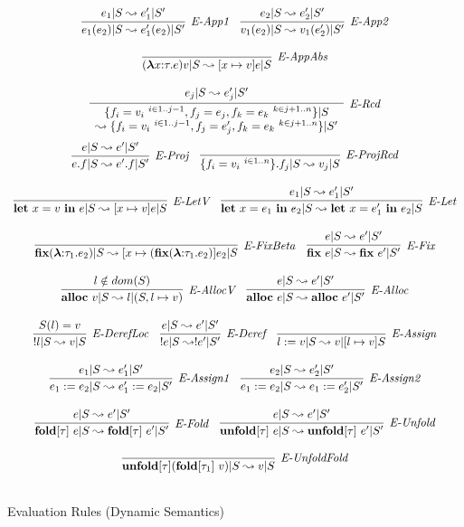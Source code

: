 \begin{figure}
\centering
\[
\begin{array}{c}
\infer[\textit{E-App1}]
	{e_1(e_2) | S \leadsto e_1'(e_2) | S'}
	{e_1 | S \leadsto e_1' | S'}
~~~
\infer[\textit{E-App2}]
	{v_1(e_2) | S \leadsto v_1(e_2') | S'}
	{e_2 | S \leadsto e_2' | S'}
\\[3ex]
\infer[\textit{E-AppAbs}]
	{(\boldsymbol\lambda x{:}\tau . e) v | S \leadsto [x \mapsto v] e | S}
	{}
\\[3ex]
\infer[\textit{E-Rcd}]
	{
\begin{array}{c}
\{ f_i = v_i ~ ^{i \in 1..j-1}, f_j = e_j, f_k = e_k ~ ^{k \in j+1..n} \} | S \\
\leadsto \{ f_i = v_i ~ ^{i \in 1..j-1}, f_j = e_j', f_k = e_k ~ ^{k \in j+1..n}\} | S'
\end{array}
	}
	{e_j | S \leadsto e_j' | S'}
\\[3ex]
\infer[\textit{E-Proj}]
	{e.f | S \leadsto e'.f | S'}
	{e | S \leadsto e' | S'}
~~~
\infer[\textit{E-ProjRcd}]
	{\{f_i = v_i ~ ^{i \in 1..n}\}.f_j | S \leadsto v_j | S}
	{}
\\[3ex]
\infer[\textit{E-LetV}]
	{\keyw{let}~ x=v ~\keyw{in}~ e | S \leadsto [x \mapsto v] e | S}
	{}
~~~
\infer[\textit{E-Let}]
	{\keyw{let}~ x=e_1 ~\keyw{in}~ e_2 | S \leadsto \keyw{let}~ x=e_1' ~\keyw{in}~ e_2 | S}
	{e_1 | S \leadsto e_1' | S'}
\\[3ex]
\infer[\textit{E-FixBeta}]
	{\keyw{fix} (\boldsymbol\lambda{:}\tau_1.e_2) | S \leadsto [x \mapsto (\keyw{fix} (\boldsymbol\lambda{:}\tau_1.e_2)] e_2 | S}
	{}
~~~
\infer[\textit{E-Fix}]
	{\keyw{fix}~ e | S \leadsto \keyw{fix}~ e' | S'}
	{e | S \leadsto e' | S'}
\\[3ex]
\infer[\textit{E-AllocV}]
	{\keyw{alloc}~ v | S \leadsto l | (S, l \mapsto v)}
	{l \notin dom(S)}
~~~
\infer[\textit{E-Alloc}]
	{\keyw{alloc}~ e | S \leadsto \keyw{alloc}~ e' | S'}
	{e | S \leadsto e' | S'}
\\[3ex]
\infer[\textit{E-DerefLoc}]
	{!l | S \leadsto v | S}
	{S(l) = v}
~~~
\infer[\textit{E-Deref}]
	{!e | S \leadsto !e' | S'}
	{e | S \leadsto e' | S'}
~~~
\infer[\textit{E-Assign}]
	{l := v | S \leadsto v | [l \mapsto v]S}
	{}
\\[3ex]
\infer[\textit{E-Assign1}]
	{e_1 := e_2 | S \leadsto e_1' := e_2 | S'}
	{e_1 | S \leadsto e_1' | S'}
~~~
\infer[\textit{E-Assign2}]
	{e_1 := e_2 | S \leadsto e_1 := e_2' | S'}
	{e_2 | S \leadsto e_2' | S'}
\\[3ex]
\infer[\textit{E-Fold}]
	{\keyw{fold}[\tau]~ e | S \leadsto \keyw{fold}[\tau]~ e' | S'}
	{e | S \leadsto e' | S'}
~~~
\infer[\textit{E-Unfold}]
	{\keyw{unfold}[\tau]~ e | S \leadsto \keyw{unfold}[\tau]~ e' | S'}
	{e | S \leadsto e' | S'}
\\[3ex]
\infer[\textit{E-UnfoldFold}]
	{\keyw{unfold}[\tau](\keyw{fold}[\tau_1]~ v) | S \leadsto v | S}
	{}
\\[3ex]
\end{array}
\]
\caption{Evaluation Rules (Dynamic Semantics)}
\end{figure}


